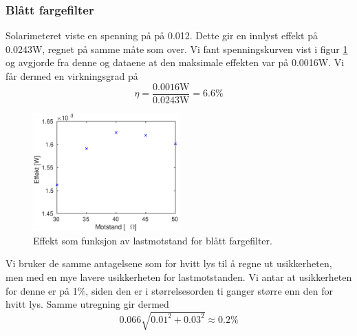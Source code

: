 \documentclass[a4paper,11pt, twocolumn]{article}
\begin{document}
\subsubsection{Blått fargefilter}
Solarimeteret viste en spenning på på 0.012. Dette gir en innlyst effekt på 0.0243W, regnet på samme måte som over. Vi fant spenningskurven vist i figur \ref{fig:effektBlue} og avgjorde fra denne og dataene at den maksimale effekten var på 0.0016W. Vi får dermed en virkningsgrad på 
\begin{equation}
	\eta = \frac{0.0016\text{W}}{0.0243\text{W}} = 6.6\text{\%}
\end{equation}
\begin{figure}[!ht]
	\includegraphics[width = 0.5\textwidth]{matlab/LAB/effektBlue.eps}
	\caption{Effekt som funksjon av lastmotstand for blått fargefilter.}
	\label{fig:effektBlue}
\end{figure}
Vi bruker de samme antagelsene som for hvitt lys til å regne ut usikkerheten, men med en mye lavere usikkerheten for lastmotstanden. Vi antar at usikkerheten for denne er på 1\%, siden den er i størrelsesorden ti ganger større enn den for hvitt lys. Samme utregning gir dermed
\begin{equation}
	0.066\sqrt{0.01^2+0.03^2} \approx 0.2\text{\%}
\end{equation}
\end{document}
